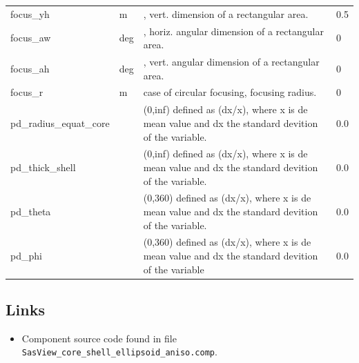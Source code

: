 \begin{longtable}{p{}p{}p{}p{}}
focus\_yh & m & , vert. dimension of a rectangular area. & 0.5 \\
focus\_aw & deg & , horiz. angular dimension of a rectangular area. & 0 \\
focus\_ah & deg & , vert. angular dimension of a rectangular area. & 0 \\
focus\_r & m & case of circular focusing, focusing radius. & 0 \\
pd\_radius\_equat\_core &  & (0,inf) defined as (dx/x), where x is de mean value and dx the standard devition of the variable. & 0.0 \\
pd\_thick\_shell &  & (0,inf) defined as (dx/x), where x is de mean value and dx the standard devition of the variable. & 0.0 \\
pd\_theta &  & (0,360) defined as (dx/x), where x is de mean value and dx the standard devition of the variable. & 0.0 \\
pd\_phi &  & (0,360) defined as (dx/x), where x is de mean value and dx the standard devition of the variable & 0.0 \\
\bottomrule
\end{longtable}

\subsection*{Links}
\begin{itemize}
  \item Component source code found in file \texttt{SasView\_core\_shell\_ellipsoid\_aniso.comp}.
\end{itemize}
